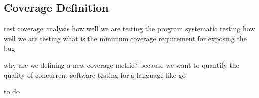 \subsection{Coverage Definition}
test coverage analysis
how well we are testing the program
systematic testing
how well we are testing
what is the minimum coverage requirement for exposing the bug

why are we defining a new coverage metric?
because we want to quantify the quality of concurrent software testing for a language like go

to do

